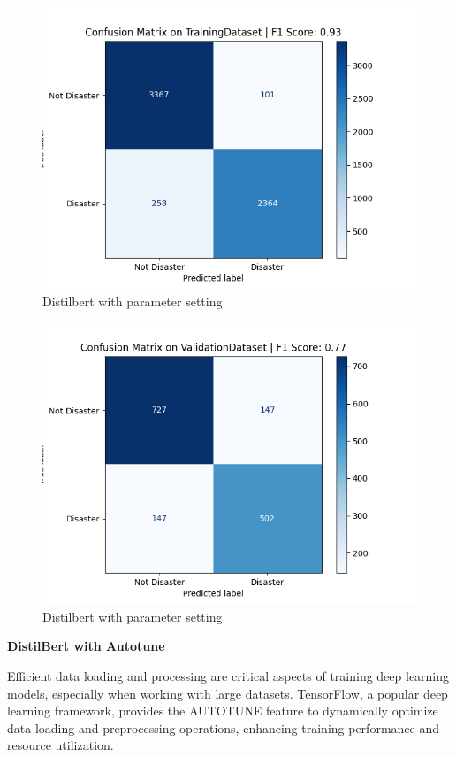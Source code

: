 \begin{figure}[ht]
    \centering
    \includegraphics[scale=0.7]{figures/Distilbert_Training_confusion_matrix.png}
    \caption{Distilbert with parameter setting}
\end{figure}

\begin{figure}[ht]
    \centering
    \includegraphics[scale=0.7]{figures/Distilbert_Validation_confusion_matrix.png}
    \caption{Distilbert with parameter setting}
\end{figure}

\newpage
\textbf{DistilBert with Autotune}

Efficient data loading and processing are critical aspects of training deep learning models, especially when working with large datasets. TensorFlow, a popular deep learning framework, provides the AUTOTUNE feature to dynamically optimize data loading and preprocessing operations, enhancing training performance and resource utilization.

